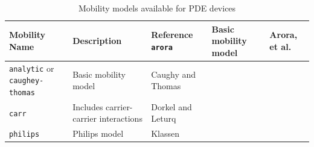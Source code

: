 

\small
\begin{longtable}[htbp]{|
>{\setlength{\hsize}{.5\hsize}}Y|
>{\setlength{\hsize}{.5\hsize}}Y|
>{\setlength{\hsize}{.5\hsize}}Y|} 
\caption[Mobility models available for PDE devices] {Mobility models available for PDE devices}
\label{Mobility_Models} \\ \hline

\color{white}\textbf{Mobility Name} 
& \color{white}\bf Description
& \color{white}\bf Reference \endhead
\texttt{arora}    & Basic mobility model & Arora, et al.~\cite{arora}\\ \hline
\texttt{analytic} or \texttt{caughey-thomas} & Basic mobility model & Caughy and Thomas~\cite{caughey}\\ \hline
\texttt{carr}     & Includes carrier-carrier interactions & Dorkel and Leturq~\cite{dorkel}\\ \hline
\texttt{philips}     & Philips model  & Klassen~\cite{philipsMobility1, philipsMobility2}\\ \hline

\end{longtable}

